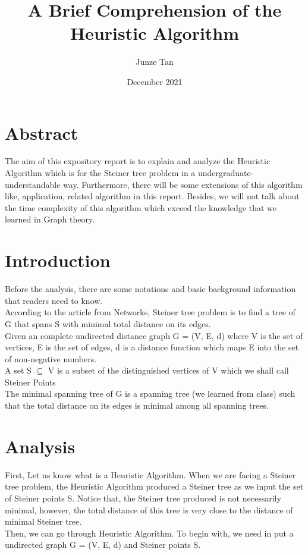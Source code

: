 \documentclass[letterpaper,11pt,twocolumn]{article}
\title{A Brief Comprehension of the Heuristic Algorithm}
\author{Junze Tan}
\date{December 2021}
\begin{document}
\maketitle %

\section{Abstract}
The aim of this expository report is to explain and analyze the Heuristic Algorithm which is for the Steiner tree problem in a undergraduate-understandable way. Furthermore, there will be some extensions of this algorithm like, application, related algorithm in this report. Besides, we will not talk about the time complexity of this algorithm which exceed the knowledge that we learned in Graph theory.


\section{Introduction}
Before the analysis, there are some notations and basic background information that readers need to know.\\
According to the article from Networks, Steiner tree problem is to find a tree of G that spans S with minimal total distance on its edges. \cite{treeProb}\\
Given an complete undirected distance graph G = (V, E, d) where V is the set of vertices, E is the set of edges, d is a distance function which maps E into the set of non-negative numbers.\\
A set S $\subseteq$ V is a subset of the distinguished vertices of V which we shall call Steiner Points \\
The minimal spanning tree of G is a spanning tree (we learned from class) such that the total distance on its edges is minimal among all spanning trees.\cite{treeProb}

\section{Analysis}
First, Let us know what is a Heuristic Algorithm. When we are facing a Steiner tree problem, the Heuristic Algorithm produced a Steiner tree as we input the set of Steiner points S. \cite{main} Notice that, the Steiner tree produced is not necessarily minimal, however, the total distance of this tree is very close to the distance of minimal Steiner tree.\\
Then, we can go through Heuristic Algorithm. To begin with, we need in put a undirected graph G = (V, E, d) and Steiner points S.
\end{document}
